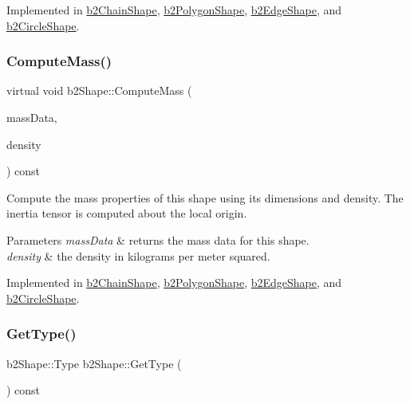 Implemented in \hyperlink{classb2_chain_shape_ae1d7470ce8d32e92d27c149ab45f5468}{b2\+Chain\+Shape}, \hyperlink{classb2_polygon_shape_ae9bcc185caf4a030003cefc4576e4717}{b2\+Polygon\+Shape}, \hyperlink{classb2_edge_shape_a238139ae1736b457d77443133ff16854}{b2\+Edge\+Shape}, and \hyperlink{classb2_circle_shape_af4a4ea78780af7a7ce40bf5d54affe83}{b2\+Circle\+Shape}.

\mbox{\label{classb2_shape_a61b365526241b47f124789b0309cac69}} 
\subsubsection{\texorpdfstring{Compute\+Mass()}{ComputeMass()}}
{\footnotesize\ttfamily virtual void b2\+Shape\+::\+Compute\+Mass (\begin{DoxyParamCaption}\item[{\hyperlink{structb2_mass_data}{b2\+Mass\+Data} $\ast$}]{mass\+Data,  }\item[{float32}]{density }\end{DoxyParamCaption}) const\hspace{0.3cm}{\ttfamily [pure virtual]}}

Compute the mass properties of this shape using its dimensions and density. The inertia tensor is computed about the local origin. 
\begin{DoxyParams}{Parameters}
{\em mass\+Data} & returns the mass data for this shape. \\
\hline
{\em density} & the density in kilograms per meter squared. \\
\hline
\end{DoxyParams}


Implemented in \hyperlink{classb2_chain_shape_aad3671d6eab61f6b26e2f1b6ac50bb98}{b2\+Chain\+Shape}, \hyperlink{classb2_polygon_shape_a908db2a51fc79fd49d6fe06be2cd8474}{b2\+Polygon\+Shape}, \hyperlink{classb2_edge_shape_ac738c1e0ab2f4dfbab26e3942efa60af}{b2\+Edge\+Shape}, and \hyperlink{classb2_circle_shape_a7dc07891abd015863fbf03076e47eec5}{b2\+Circle\+Shape}.

\mbox{\label{classb2_shape_a600cceee6186d81bb1b8ab142324bba6}} 
\subsubsection{\texorpdfstring{Get\+Type()}{GetType()}}
{\footnotesize\ttfamily b2\+Shape\+::\+Type b2\+Shape\+::\+Get\+Type (\begin{DoxyParamCaption}{ }\end{DoxyParamCaption}) const\hspace{0.3cm}{\ttfamily [inline]}}

